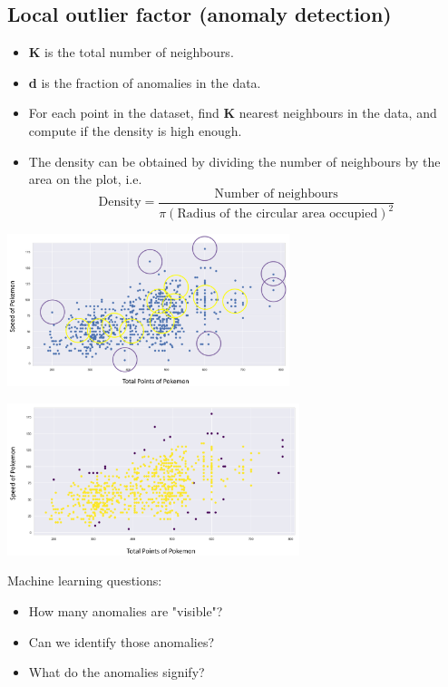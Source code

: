 \documentclass[11pt]{article}
\begin{document}
 \newpage
\subsection{Local outlier factor (anomaly detection)}
\label{sec:orga9722a3}
\begin{itemize}
\item \textbf{K} is the total number of neighbours.
\item \textbf{d} is the fraction of anomalies in the data.
\item For each point in the dataset, find \textbf{K} nearest neighbours in the data, and compute if the density is high enough.
\item The density can be obtained by dividing the number of neighbours by the area on the plot, i.e.
\[\text{Density} = \frac{\text{Number of neighbours}}{\pi \left(\text{Radius of the circular area occupied} \right)^2}\]
\end{itemize}

\begin{center}
\includegraphics[height=12em]{./images/k-th-nearest-neighbours-graph.png}
\end{center}

\begin{center}
\includegraphics[height=12em]{./images/k-th-nearest-neighbours-result.png}
\end{center}

Machine learning questions:
\begin{itemize}
\item How many anomalies are "visible"?
\item Can we identify those anomalies?
\item What do the anomalies signify?
\end{itemize}
\end{document}
